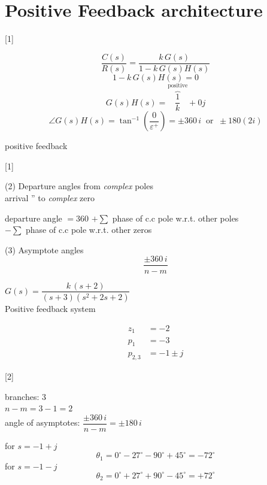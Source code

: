 \documentclass[11pt,a4paper]{article}
\begin{document}

\section{Positive Feedback architecture}

[1]

\[
\frac{C(s)}{R(s)} = \frac{k\,G(s)}{1 - k\,G(s)H(s)}
\]
\[
1 - k\,G(s)H(s) = 0
\]
\[
G(s)H(s) = \overbrace{\frac{1}{k}}^{\text{positive}} + 0j
\]
\[
\angle G(s)H(s) = \tan^{-1}\!\left(\frac{0}{\varepsilon^{+}}\right) = \pm 360\,i \ \text{ or } \ \pm 180(2i)
\]

positive feedback

[1]

(2) Departure angles from \textit{complex} poles\\
arrival \quad '' \quad to \textit{complex} zero

\noindent departure angle $= 360$ \okunamadi{} $+\sum$ phase of c.c pole w.r.t. other poles\\
\hspace*{5.2em}$-\sum$ phase of c.c pole w.r.t. other zeros

\medskip
\noindent (3) Asymptote angles
\[
\frac{\pm 360\,i}{n-m}
\]

\begin{ornek}
$G(s)=\dfrac{k\,(s+2)}{(s+3)(s^2+2s+2)}$\\
Positive feedback system
\end{ornek}

\begin{align*}
z_1 &= -2\\
p_1 &= -3\\
p_{2,3} &= -1 \pm j
\end{align*}

[2]

\noindent branches: 3\\
$n-m = 3-1 = 2$\\
angle of asymptotes: $\dfrac{\pm 360\,i}{n-m} = \pm 180\,i$

\medskip
\noindent for $s=-1+j$
\[
\theta_1 = 0^\circ - 27^\circ - 90^\circ + 45^\circ = -72^\circ
\]
for $s=-1-j$
\[
\theta_2 = 0^\circ + 27^\circ + 90^\circ - 45^\circ = +72^\circ
\]
\end{document}
